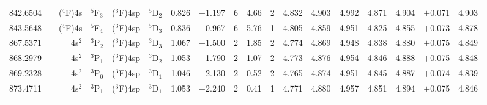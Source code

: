 \documentclass[traditabstract]{aa}
\newcommand{\pst}{\phantom{*}}
\begin{document}
\begin{center}
\begin{mpsupertabular}{r@{}c@{\ \ \ }r@{~}l@{\ }r@{~}l@{\ \ \ }c@{\ \ \ }c@{\ \ \ }c@{\ \ \ }c@{\ \ \ }c@{\ \ \ }c@{\ \ \ }c@{\ \ \ }c@{\ \ \ }c@{\ \ \ }c@{\ \ \ }r@{\ \ \ }c}
842.6504 & & \footnotesize ($^4$F)4s &\footnotesize$^5$F$_3$             &\footnotesize($^3$F)4sp &\footnotesize$^5$D$_2$             & 0.826 & $-$1.197 & 6  & 4.66 & 2\pst      & 4.832 & 4.903 & 4.992 & 4.871 & 4.904 & $+$0.071    & 4.903 \\
843.5648 & & \footnotesize ($^4$F)4s &\footnotesize$^5$F$_4$             &\footnotesize($^3$F)4sp &\footnotesize$^5$D$_3$             & 0.836 & $-$0.967 & 6  & 5.76 & 1\pst      & 4.805 & 4.859 & 4.951 & 4.825 & 4.855 & $+$0.073    & 4.878 \\
867.5371 & & \footnotesize 4s$^2$    &\footnotesize$^3$P$_2$             &\footnotesize($^3$F)4sp &\footnotesize$^3$D$_3$             & 1.067 & $-$1.500 & 2  & 1.85 & 2\pst      & 4.774 & 4.869 & 4.948 & 4.838 & 4.880 & $+$0.075    & 4.849 \\
868.2979 & & \footnotesize 4s$^2$    &\footnotesize$^3$P$_1$             &\footnotesize($^3$F)4sp &\footnotesize$^3$D$_2$             & 1.053 & $-$1.790 & 2  & 1.07 & 2\pst      & 4.773 & 4.876 & 4.954 & 4.846 & 4.888 & $+$0.075    & 4.848 \\
869.2328 & & \footnotesize 4s$^2$    &\footnotesize$^3$P$_0$             &\footnotesize($^3$F)4sp &\footnotesize$^3$D$_1$             & 1.046 & $-$2.130 & 2  & 0.52 & 2\pst      & 4.765 & 4.874 & 4.951 & 4.845 & 4.887 & $+$0.074    & 4.839 \\
873.4711 & & \footnotesize 4s$^2$    &\footnotesize$^3$P$_1$             &\footnotesize($^3$F)4sp &\footnotesize$^3$D$_1$             & 1.053 & $-$2.240 & 2  & 0.41 & 1\pst      & 4.771 & 4.880 & 4.957 & 4.851 & 4.894 & $+$0.075    & 4.846 \\
   & & & & & & & & & & & & & & & \\



\end{mpsupertabular}
\end{center}
\end{document}
